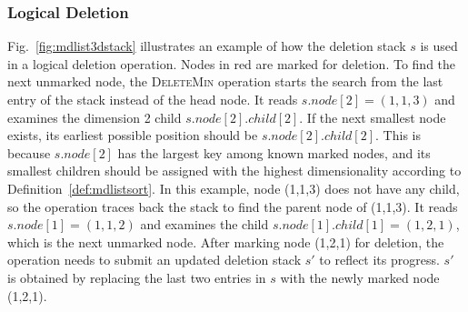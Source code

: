 \documentclass[10pt,journal,letter,compsoc]{IEEEtran}
\begin{document}
\subsubsection{Logical Deletion}
Fig.~\ref{fig:mdlist3dstack} illustrates an example of how the deletion stack $s$ is used in a logical deletion operation.
Nodes in red are marked for deletion.
To find the next unmarked node, the \textsc{DeleteMin} operation starts the search from the last entry of the stack instead of the head node.
It reads $s.node[2]=(1,1,3)$ and examines the dimension 2 child $s.node[2].child[2]$.
If the next smallest node exists, its earliest possible position should be $s.node[2].child[2]$.
This is because $s.node[2]$ has the largest key among known marked nodes, and its smallest children should be assigned with the highest dimensionality according to Definition~\ref{def:mdlistsort}.
In this example, node (1,1,3) does not have any child, so the operation traces back the stack to find the parent node of (1,1,3).
It reads $s.node[1]=(1,1,2)$ and examines the child $s.node[1].child[1]=(1,2,1)$, which is the next unmarked node.
After marking node (1,2,1) for deletion, the operation needs to submit an updated deletion stack $s'$ to reflect its progress. 
$s'$ is obtained by replacing the last two entries in $s$ with the newly marked node (1,2,1).

\end{document}
